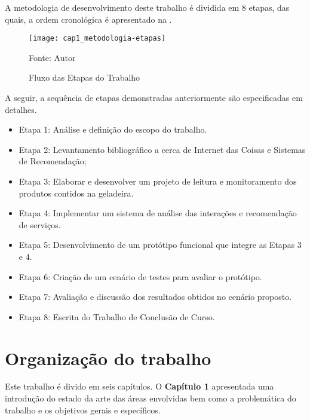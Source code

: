 A metodologia de desenvolvimento deste trabalho é dividida em 8 etapas, das quais, a ordem cronológica é apresentado na .

\begin{figure}[hb]
    
    \caption{Fluxo das Etapas do Trabalho}
    \texttt{[image: cap1\_metodologia-etapas]}
    \label{fig:cap1_metodologia-etapas}
    
    \footnotesize{Fonte: Autor}
\end{figure}

A seguir, a sequência de etapas demonstradas anteriormente são especificadas em detalhes.

\begin{itemize}\parskip -1pt
    \item Etapa 1: Análise e definição do escopo do trabalho.
	\item Etapa 2: Levantamento bibliográfico a cerca de Internet das Coisas e Sistemas de Recomendação;
	\item Etapa 3: Elaborar e desenvolver um projeto de leitura e monitoramento dos produtos contidos na geladeira.
	\item Etapa 4: Implementar um sistema de análise das interações e recomendação de serviços.
	\item Etapa 5: Desenvolvimento de um protótipo funcional que integre as Etapas 3 e 4.
	\item Etapa 6: Criação de um cenário de testes para avaliar o protótipo.
	\item Etapa 7: Avaliação e discussão dos resultados obtidos no cenário proposto.
	\item Etapa 8: Escrita do Trabalho de Conclusão de Curso.
\end{itemize}




\section{Organização do trabalho} %

Este trabalho é divido em seis capítulos. O \textbf{Capítulo 1} apresentada uma introdução do estado da arte das áreas envolvidas bem como a problemática do trabalho e os objetivos gerais e específicos.

